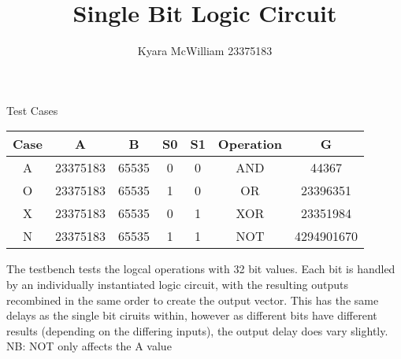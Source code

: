 \documentclass{article}
\title{Single Bit Logic Circuit}
\author{Kyara McWilliam 23375183}
\date{}
\begin{document}
\maketitle

Test Cases
\hfill \break

\begin{tabular}{ |c|c|c|c|c|c|c| }
\hline
Case & A & B & S0 & S1 & Operation & G \\
\hline
A & 23375183 & 65535 & 0 & 0 & AND & 44367 \\
O & 23375183 & 65535 & 1 & 0 & OR & 23396351 \\
X & 23375183 & 65535 & 0 & 1 & XOR & 23351984 \\
N & 23375183 & 65535 & 1 & 1 & NOT & 4294901670 \\
\hline
\end{tabular}
\hfill \break \break
The testbench tests the logcal operations with 32 bit values. Each bit is handled by an individually instantiated logic circuit, with the resulting outputs recombined in the same order to create the output vector. This has the same delays as the single bit ciruits within, however as different bits have different results (depending on the differing inputs), the output delay does vary slightly.
\hfill \break
NB: NOT only affects the A value
\end{document}
